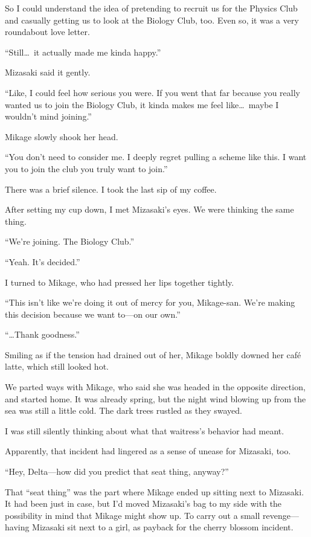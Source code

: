 \documentclass[
    a4paper,
    12pt,
    twoside,
    openany,
    UTF8,
    fontset=windows
]{ctexbook}
\begin{document}
So I could understand the idea of pretending to recruit us for the Physics Club and casually getting us to look at the Biology Club, too. Even so, it was a very roundabout love letter.

``Still\dots\ it actually made me kinda happy.''

Mizasaki said it gently.

``Like, I could feel how serious you were. If you went that far because you really wanted us to join the Biology Club, it kinda makes me feel like\dots\ maybe I wouldn't mind joining.''

Mikage slowly shook her head.

``You don't need to consider me. I deeply regret pulling a scheme like this. I want you to join the club you truly want to join.''

There was a brief silence. I took the last sip of my coffee.

After setting my cup down, I met Mizasaki's eyes. We were thinking the same thing.

``We're joining. The Biology Club.''

``Yeah. It's decided.''

I turned to Mikage, who had pressed her lips together tightly.

``This isn't like we're doing it out of mercy for you, Mikage-san. We're making this decision because we want to---on our own.''

``\dots Thank goodness.''

Smiling as if the tension had drained out of her, Mikage boldly downed her café latte, which still looked hot.

We parted ways with Mikage, who said she was headed in the opposite direction, and started home. It was already spring, but the night wind blowing up from the sea was still a little cold. The dark trees rustled as they swayed.

I was still silently thinking about what that waitress's behavior had meant.

Apparently, that incident had lingered as a sense of unease for Mizasaki, too.

``Hey, Delta---how did you predict that seat thing, anyway?''

That ``seat thing'' was the part where Mikage ended up sitting next to Mizasaki. It had been just in case, but I'd moved Mizasaki's bag to my side with the possibility in mind that Mikage might show up. To carry out a small revenge---having Mizasaki sit next to a girl, as payback for the cherry blossom incident.
\end{document}
